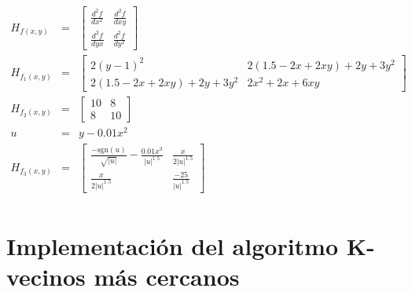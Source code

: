 \documentclass{article}
\begin{document}
\begin{enumerate}
\begin{equation}
\begin{array}{rcl}
H_{f(x,y)}&=&
\begin{bmatrix}
\frac{d^2f}{dx^2}&\frac{d^2f}{dxy}\\
\frac{d^2f}{dyx}&\frac{d^2f}{dy^2}
\end{bmatrix}\\
H_{f_1(x,y)}&=&
\begin{bmatrix}
2(y-1)^2&2(1.5-2x+2xy)+2y+3y^2\\
2(1.5-2x+2xy)+2y+3y^2&2x^2+2x+6xy
\end{bmatrix}\\
H_{f_2(x,y)}&=&
\begin{bmatrix}
10&8\\
8&10
\end{bmatrix}\\
u&=&y-0.01x^2\\
H_{f_3(x,y)}&=&
\begin{bmatrix}
\frac{-\text{sgn}(u)}{\sqrt{|u|}}-\frac{0.01x^3}{|u|^{1.5}}&\frac{x}{2|u|^{1.5}}\\
\frac{x}{2|u|^{1.5}}&\frac{-25}{|u|^{1.5}}
\end{bmatrix}\\
\end{array}
\end{equation}
\end{enumerate}

\section{Implementación del algoritmo K-vecinos más cercanos}
\end{document}
